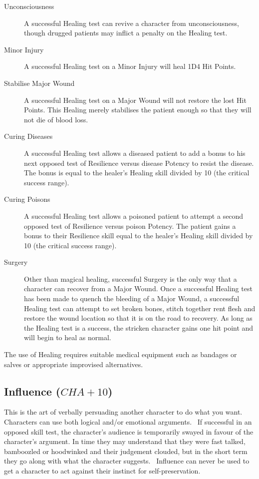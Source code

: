 \begin{description}
\item[Unconsciousness] A successful Healing test can revive a character from unconsciousness, though drugged patients may inflict a penalty on the Healing test.
\item[Minor Injury] A successful Healing test on a Minor Injury will heal 1D4 Hit Points. 
\item[Stabilise Major Wound] A successful Healing test on a Major Wound will not restore the lost Hit Points. This Healing merely stabilises the patient enough so that they will not die of blood loss.
\item[Curing Diseases] A successful Healing test allows a diseased patient to add a bonus to his next opposed test of Resilience versus disease Potency to resist the disease. The bonus is equal to the healer’s Healing skill divided by 10 (the critical success range).
\item[Curing Poisons] A successful Healing test allows a poisoned patient to attempt a second opposed test of Resilience versus poison Potency. The patient gains a bonus to their Resilience skill equal to the healer’s Healing skill divided by 10 (the critical success range).
\item[Surgery] Other than magical healing, successful Surgery is the only way that a character can recover from a Major Wound. Once a successful Healing test has been made to quench the bleeding of a Major Wound, a successful Healing test can attempt to set broken bones, stitch together rent flesh and restore the wound location so that it is on the road to recovery. As long as the Healing test is a success, the stricken character gains one hit point and will begin to heal as normal.
\end{description}

The use of Healing requires suitable medical equipment such as bandages or salves or appropriate improvised alternatives. 


\subsection{Influence ($CHA+10$)}
This is the art of verbally persuading another character to do what you want. Characters can use both logical and/or emotional arguments.  If successful in an opposed skill test, the character’s audience is temporarily swayed in favour of the character’s argument. In time they may understand that they were fast talked, bamboozled or hoodwinked and their judgement clouded, but in the short term they go along with what the character suggests.  Influence can never be used to get a character to act against their instinct for self-preservation.

